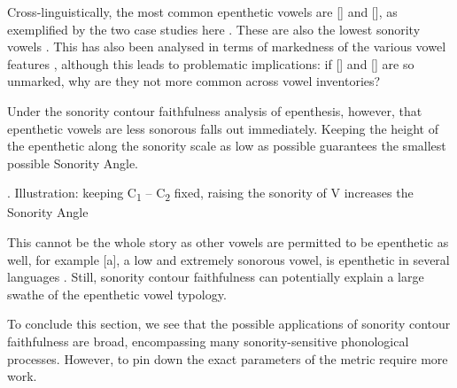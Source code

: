 \documentclass[12pt]{article}
\begin{document}
\bigskip

 Cross-linguistically, the most common epenthetic vowels are [] and [], as exemplified by the two case studies here \citep{lombardi.2002}. These are also the lowest sonority vowels \citep{parker.2002}. This has also been analysed in terms of markedness of the various vowel features \citep{lombardi.2002}, although this leads to problematic implications: if [] and [] are so unmarked, why are they not more common across vowel inventories?

Under the sonority contour faithfulness analysis of epenthesis, however, that epenthetic vowels are less sonorous falls out immediately. Keeping the height of the epenthetic along the sonority scale as low as possible guarantees the smallest possible {\sc Sonority Angle}.

\ex. Illustration: keeping C\textsubscript{1} -- C\textsubscript{2} fixed, raising the sonority of V increases the {\sc Sonority Angle}

\begin{center}
\end{center}

This cannot be the whole story as other vowels are permitted to be epenthetic as well, for example [a], a low and extremely sonorous vowel, is epenthetic in several languages \citep{lombardi.2002}. Still, sonority contour faithfulness can potentially explain a large swathe of the epenthetic vowel typology.

\bigskip

To conclude this section, we see that the possible applications of sonority contour faithfulness are broad, encompassing many sonority-sensitive phonological processes. However, to pin down the exact parameters of the metric require more work.
\end{document}
